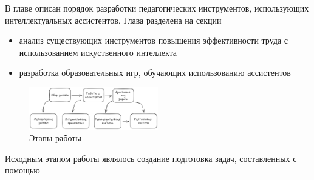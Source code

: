 В главе описан порядок разработки  педагогических инструментов, использующих интеллектуальных ассистентов. Глава разделена на секции 
\begin{itemize}
    \item анализ существующих инструментов повышения эффективности труда с использованием искуственного интеллекта
    \item разработка образовательных игр, обучающих использованию ассистентов 
\end{itemize}


\begin{figure}[h]
    \centering
    \includegraphics[width=0.5\textwidth]{assets/work/overview/plan.excalidraw.png}
    \caption{Этапы работы}
    \label{chess}
\end{figure}

Исходным этапом работы являлось создание подготовка задач, составленных с помощью 

